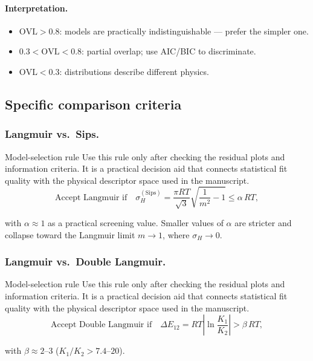 \documentclass[journal=jacsat,manuscript=article]{achemso}
\begin{document}
\paragraph{Interpretation.}
\begin{itemize}
	\item $\mathrm{OVL} > 0.8$: models are practically
	indistinguishable --- prefer the simpler one.
	\item $0.3 < \mathrm{OVL} < 0.8$: partial overlap; use AIC/BIC
	to discriminate.
	\item $\mathrm{OVL} < 0.3$: distributions describe different
	physics.
\end{itemize}

\subsection{Specific comparison criteria}
\label{sec:si_comparison_criteria}

\subsubsection{Langmuir vs.\ Sips.}

\begin{bluebox}{Model-selection rule}
	Use this rule only after checking the residual plots and information criteria. It is a practical decision aid that connects statistical fit quality with the physical descriptor space used in the manuscript.
\begin{equation}
	\text{Accept Langmuir if}\quad
		\sigma_H^{\mathrm{(Sips)}}
		= \frac{\pi RT}{\sqrt{3}}\sqrt{\frac{1}{m^2}-1} \leq \alpha\,RT,
	\label{eq:si_criterion_LvsS}
\end{equation}
\end{bluebox}

with $\alpha \approx 1$ as a practical screening value. Smaller
values of $\alpha$ are stricter and collapse toward the Langmuir limit
$m \to 1$, where $\sigma_H \to 0$.

\subsubsection{Langmuir vs.\ Double Langmuir.}
\begin{bluebox}{Model-selection rule}
	Use this rule only after checking the residual plots and information criteria. It is a practical decision aid that connects statistical fit quality with the physical descriptor space used in the manuscript.
\begin{equation}
	\text{Accept Double Langmuir if}\quad
		\Delta E_{12} = RT\left|\ln\frac{K_1}{K_2}\right| > \beta\,RT,
	\label{eq:si_criterion_LvsDL}
\end{equation}
\end{bluebox}
with $\beta \approx 2$--$3$ ($K_1/K_2 > 7.4$--$20$).
\end{document}
